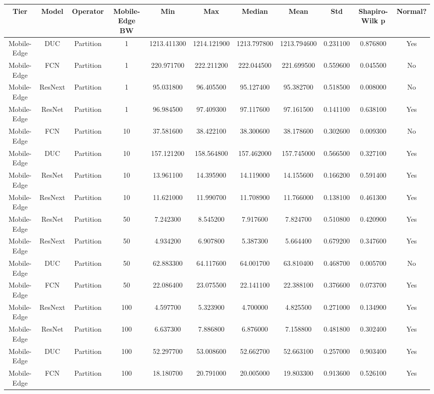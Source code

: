 \begin{tabular}{|c||c||c||c||c||c||c||c||c||c||c|}
\toprule
Tier & Model & Operator & Mobile-Edge BW & Min & Max & Median & Mean & Std & Shapiro-Wilk p & Normal? \\
\midrule
Mobile-Edge & DUC & Partition & 1 & 1213.411300 & 1214.121900 & 1213.797800 & 1213.794600 & 0.231100 & 0.876800 & Yes \\
Mobile-Edge & FCN & Partition & 1 & 220.971700 & 222.211200 & 222.044500 & 221.699500 & 0.559600 & 0.045500 & No \\
Mobile-Edge & ResNext & Partition & 1 & 95.031800 & 96.405500 & 95.127400 & 95.382700 & 0.518500 & 0.008000 & No \\
Mobile-Edge & ResNet & Partition & 1 & 96.984500 & 97.409300 & 97.117600 & 97.161500 & 0.141100 & 0.638100 & Yes \\
Mobile-Edge & FCN & Partition & 10 & 37.581600 & 38.422100 & 38.300600 & 38.178600 & 0.302600 & 0.009300 & No \\
Mobile-Edge & DUC & Partition & 10 & 157.121200 & 158.564800 & 157.462000 & 157.745000 & 0.566500 & 0.327100 & Yes \\
Mobile-Edge & ResNet & Partition & 10 & 13.961100 & 14.395900 & 14.119000 & 14.155600 & 0.166200 & 0.591400 & Yes \\
Mobile-Edge & ResNext & Partition & 10 & 11.621000 & 11.990700 & 11.708900 & 11.766000 & 0.138100 & 0.461300 & Yes \\
Mobile-Edge & ResNet & Partition & 50 & 7.242300 & 8.545200 & 7.917600 & 7.824700 & 0.510800 & 0.420900 & Yes \\
Mobile-Edge & ResNext & Partition & 50 & 4.934200 & 6.907800 & 5.387300 & 5.664400 & 0.679200 & 0.347600 & Yes \\
Mobile-Edge & DUC & Partition & 50 & 62.883300 & 64.117600 & 64.001700 & 63.810400 & 0.468700 & 0.005700 & No \\
Mobile-Edge & FCN & Partition & 50 & 22.086400 & 23.075500 & 22.141100 & 22.388100 & 0.376600 & 0.073700 & Yes \\
Mobile-Edge & ResNext & Partition & 100 & 4.597700 & 5.323900 & 4.700000 & 4.825500 & 0.271000 & 0.134900 & Yes \\
Mobile-Edge & ResNet & Partition & 100 & 6.637300 & 7.886800 & 6.876000 & 7.158800 & 0.481800 & 0.302400 & Yes \\
Mobile-Edge & DUC & Partition & 100 & 52.297700 & 53.008600 & 52.662700 & 52.663100 & 0.257000 & 0.903400 & Yes \\
Mobile-Edge & FCN & Partition & 100 & 18.180700 & 20.791000 & 20.005000 & 19.803300 & 0.913600 & 0.526100 & Yes \\

\end{tabular}
